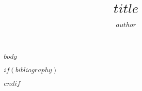 \documentclass[$if(fontsize)$$fontsize$,$endif$$if(handout)$handout,$endif$$if(beamer)$ignorenonframetext,$endif$$for(classoption)$$classoption$$sep$,$endfor$]{$documentclass$}
\title
{$title$}
\author
{$author$}
\institute[fu:stat]
{Statistische Beratungseinheit der FU Berlin}
\begin{document}
\begin{frame}[plain]

  \titlepage

\end{frame}



$body$


$if(bibliography)$
\begin{frame}[allowframebreaks]


\printbibliography
\end{frame}
$endif$
\end{document}
